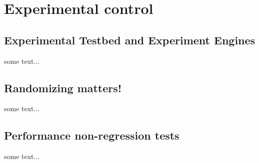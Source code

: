 \chapter{Experimental control}
\label{chapter:experiment}

\section{Experimental Testbed and Experiment Engines}%
\label{sec:experiment:testbed}

    some text...

\section{Randomizing matters!}%
\label{sec:experiment:randomizing}

    some text...

\section{Performance non-regression tests}%
\label{sec:experiment:tests}

    some text...
